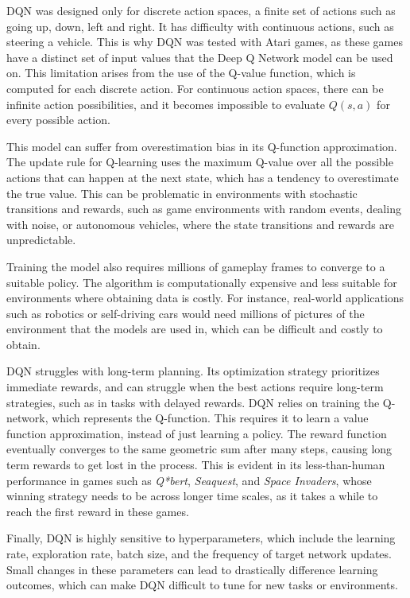 \documentclass{article}
\begin{document}
DQN was designed only for discrete action spaces, a finite set of actions such as going up, down, left and right. It has difficulty with continuous actions, such as steering a vehicle. This is why DQN was tested with Atari games, as these games have a distinct set of input values that the Deep Q Network model can be used on. This limitation arises from the use of the Q-value function, which is computed for each discrete action. For continuous action spaces, there can be infinite action possibilities, and it becomes impossible to evaluate $Q(s,a)$ for every possible action.

This model can suffer from overestimation bias in its Q-function approximation. The update rule for Q-learning uses the maximum Q-value over all the possible actions that can happen at the next state, which has a tendency to overestimate the true value. This can be problematic in environments with stochastic transitions and rewards, such as game environments with random events, dealing with noise, or autonomous vehicles, where the state transitions and rewards are unpredictable. 

Training the model also requires millions of gameplay frames to converge to a suitable policy. The algorithm is computationally expensive and less suitable for environments where obtaining data is costly. For instance, real-world applications such as robotics or self-driving cars would need millions of pictures of the environment that the models are used in, which can be difficult and costly to obtain. 

DQN struggles with long-term planning. Its optimization strategy prioritizes immediate rewards, and can struggle when the best actions require long-term strategies, such as in tasks with delayed rewards. DQN relies on training the Q-network, which represents the Q-function. This requires it to learn a value function approximation, instead of just learning a policy. The reward function eventually converges to the same geometric sum after many steps, causing long term rewards to get lost in the process. This is evident in its less-than-human performance in games such as \textit{Q*bert}, \textit{Seaquest}, and \textit{Space Invaders}, whose winning strategy needs to be across longer time scales, as it takes a while to reach the first reward in these games. 

Finally, DQN is highly sensitive to hyperparameters, which include the learning rate, exploration rate, batch size, and the frequency of target network updates. Small changes in these parameters can lead to drastically difference learning outcomes, which can make DQN difficult to tune for new tasks or environments.  
\end{document}
